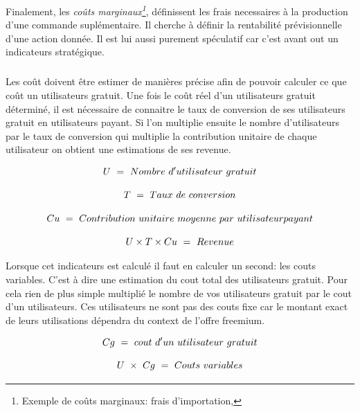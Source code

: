 \documentclass[11pt, a4paper ]{article}
\begin{document}
Finalement, les \emph{coûts marginaux\footnote{Exemple de coûts marginaux: frais d'importation, }}, définissent les frais necessaires à la production d'une commande suplémentaire. Il cherche à définir la rentabilité prévisionnelle d'une action donnée. Il est lui aussi purement spéculatif car c'est avant out un indicateurs stratégique.
\subparagraph{}
Les coût doivent être estimer de manières précise afin de pouvoir calculer ce que coût un utilisateurs gratuit. Une fois le coût réel d'un utilisateurs gratuit déterminé, il est nécessaire de connaitre le taux de conversion de ses utilisateurs gratuit en utilisateurs payant. Si l'on multiplie ensuite le nombre d'utilisateurs par le taux de conversion qui multiplie la contribution unitaire de chaque utilisateur on obtient une estimations de ses revenue\cite{equationFreemium}.

\begin{equation}\index{U!définition}
	U\ =\ Nombre\ d'utilisateur\ gratuit
\end{equation}


\begin{equation}\index{T!définition}
	T\ =\ Taux\ de\ conversion
\end{equation}


\begin{equation} \index{Cu!définition}
	Cu\ =\ Contribution\ unitaire\ moyenne\ par\ utilisateur payant
\end{equation}


\begin{equation}\index{Revenue!définition}
	U \times T \times Cu\ =\ Revenue
\end{equation}

Lorsque cet indicateurs est calculé il faut en calculer un second: les couts variables. C'est à dire une estimation du cout total des utilisateurs gratuit. Pour cela rien de plus simple multiplié le nombre de vos utilisateurs gratuit par le cout d'un utilisateurs. Ces utilisateurs ne sont pas des couts fixe car le montant exact de leurs utilisations dépendra du context de l'offre freemium.

\begin{equation}\index{Cg!définition}
	Cg\ =\ cout\ d'un\ utilisateur\ gratuit
\end{equation}


\begin{equation}\index{Couts variables!calcule}
	U\ \times\ Cg\ =\ Couts\ variables
\end{equation}
\end{document}
